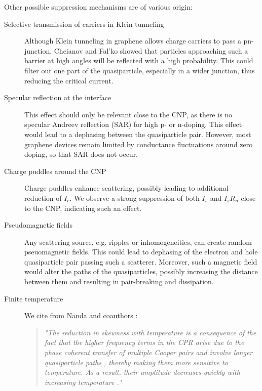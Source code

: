 Other possible suppression mechanisms are of various origin:
\begin{description}
	\item[Selective transmission of carriers in Klein tunneling] Although Klein tunneling in graphene allows charge carriers to pass a pn-junction, Cheianov and Fal'ko showed that particles approaching such a barrier at high angles will be reflected with a high probability.\cite{chialvoCurrentphaseRelationGraphene2010}
	This could filter out one part of the quasiparticle, especially in a wider junction, thus reducing the critical current.\cite{benshalomQuantumOscillationsCritical2015}
	\item[Specular reflection at the interface] This effect should only be relevant close to the CNP, as there is no specular Andreev reflection (SAR) for high p- or n-doping.
	This effect would lead to a dephasing between the quasiparticle pair.
	However, most graphene devices remain limited by conductance fluctuations around zero doping, so that SAR does not occur.
	\item[Charge puddles around the CNP] Charge puddles enhance scattering, possibly leading to additional reduction of $I_c$.
	We observe a strong suppression of both $I_s$ and $I_s R_n$ close to the CNP, indicating such an effect.
	\item[Pseudomagnetic fields] Any scattering source, e.g. ripples or inhomogeneities, can create random pseuomagnetic fields.
	This could lead to dephasing of the electron and hole quasiparticle pair passing such a scatterer.
	Moreover, such a magnetic field would alter the paths of the quasiparticles, possibly increasing the distance between them and resulting in pair-breaking and dissipation.
	\item[Finite temperature] We cite from Nanda and coauthors \cite{nandaCurrentPhaseRelationBallistic2017}:
	\begin{quotation}
		\textit{"The reduction in skewness with temperature is a consequence of the fact that the higher frequency terms in the CPR arise due to the phase coherent transfer of multiple Cooper pairs and involve longer quasiparticle paths \cite{heikkilaSupercurrentcarryingDensityStates2002a}, thereby making them more sensitive to temperature.
			As a result, their amplitude decreases quickly with increasing temperature \cite{hagymasiJosephsonCurrentBallistic2010,black-schafferStronglyAnharmonicCurrentphase2010,rakytaMagneticFieldOscillations2016,englishObservationNonsinusoidalCurrentphase2016}."}
	\end{quotation}
	

\end{description}
